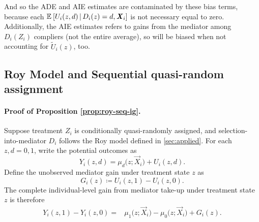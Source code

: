 And so the ADE and AIE estimates are contaminated by these bias terms, because each $\mathbb{E}_{} \left[  U_i(z,d)  \, \middle\vert \, D_i(z) = d, \boldsymbol{\mathit{X}}_i \right]$ is not necessary equal to zero.
Additionally, the AIE estimates refers to gains from the mediator among $D_i(Z_i)$ compliers (not the entire average), so will be biased when not accounting for $\tilde U_i(z)$, too.

\subsection{Roy Model and Sequential quasi-random assignment}
\label{appendix:roy-seq-ig}
\paragraph{Proof of Proposition \ref{prop:roy-seq-ig}.}
Suppose treatment $Z_i$ is conditionally quasi-randomly assigned, and selection-into-mediator $D_i$ follows the Roy model defined in \autoref{sec:applied}.
For each $z,d=0,1$, write the potential outcomes as
\[
    Y_i(z,d)
    =
    \mu_d
    \big(
        z;\vec X_i
    \big)
    +
    U_i(z,d).
\]
Define the unobserved mediator gain under treatment state $z$ as
\[
    G_i(z)
    \coloneqq
    U_i(z,1)
    -
    U_i(z,0).
    \label{eqn:roy-unobserved-gain}
\]
The complete individual-level gain from mediator take-up under treatment state $z$ is therefore
\[
    \begin{aligned}
    Y_i(z,1)-Y_i(z,0)
    ={}&
    \mu_1
    \big(
        z;\vec X_i
    \big)
    -
    \mu_0
    \big(
        z;\vec X_i
    \big)
    +
    G_i(z).
    \end{aligned}
    \label{eqn:roy-complete-mediator-gain}
\]

